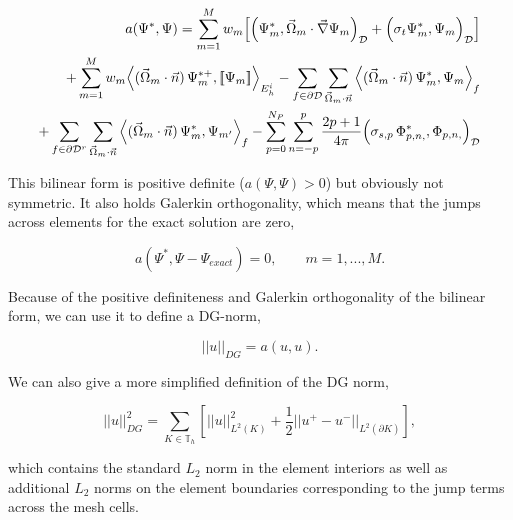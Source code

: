 \begin{equation}
\label{eq::Sn_Spatial_Convergence_bilinear}
\begin{aligned}
a(\Psi^{*},\Psi) = \sum\displaylimits_{m=1}^M w_m \Big[  \Big(  \Psi_m^{*}, \vec{\Omega}_m \cdot   \vec{\nabla} \Psi_{m} \Big)_{\mathcal{D}} + \Big( \sigma_t  \Psi_m^{*},  \Psi_{m} \Big)_{\mathcal{D}}  \Big]  \\
+ \sum\displaylimits_{m=1}^M w_m \Big< ( \vec{\Omega}_m \cdot \vec{n} ) \, \Psi_m^{* +}, [\![ \Psi_m]\!]  \Big>_{E_h^i} - \sum\displaylimits_{f \in \partial \mathcal{D}} \sum\displaylimits_{\vec{\Omega}_m \cdot \vec{n}} \Big< ( \vec{\Omega}_m \cdot \vec{n} ) \, \Psi_m^{*}, {\Psi}_m  \Big>_{f}  \\
+ \sum\displaylimits_{f \in \partial \mathcal{D}^r} \sum\displaylimits_{\vec{\Omega}_m \cdot \vec{n}} \Big< ( \vec{\Omega}_m \cdot \vec{n} ) \, \Psi_m^{*}, {\Psi}_{m'}  \Big>_{f} -      \sum_{p=0}^{N_P} \sum_{n=-p}^{p} \frac{2p + 1}{4 \pi}   \Big(  \sigma_{s,p} \,  \Phi_{p,n,}^{*},  \Phi_{p,n,} \Big)_{\mathcal{D}} 
\end{aligned}
\end{equation}

\noindent This bilinear form is positive definite ($a(\Psi,\Psi) > 0$) but obviously not symmetric. It also holds Galerkin orthogonality, which means that the jumps across elements for the exact solution are zero,

\begin{equation}
\label{eq::Sn_Spatial_Convergence_Galerkin_orth}
a(\Psi^{*},\Psi - \Psi_{exact})  = 0, \qquad m=1,...,M .
\end{equation}

\noindent Because of the positive definiteness and Galerkin orthogonality of the bilinear form, we can use it to define a DG-norm,

\begin{equation}
\label{eq::Sn_Spatial_Convergence_DGnorm_bilinear}
|| u  ||_{DG} = a(u,u).
\end{equation}

\noindent We can also give a more simplified definition of the DG norm,

\begin{equation}
\label{eq::Sn_Spatial_Convergence_DGform}
|| u ||^2_{DG} = \sum_{K \in \mathbb{T}_h} \left[  || u  ||^2_{L^2 (K)} + \frac{1}{2} || u^+ - u^- ||_{L^2 (\partial K)} \right],
\end{equation}

\noindent which contains the standard $L_2$ norm in the element interiors as well as additional $L_2$ norms on the element boundaries corresponding to the jump terms across the mesh cells.

